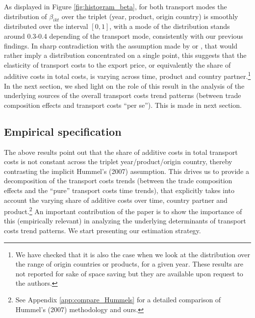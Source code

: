 \documentclass[a4paper,11pt]{article}
\begin{document}
As displayed in Figure \ref{fig:histogram_beta}, for both transport modes the distribution of $\beta_{ikt}$ over the triplet (year, product, origin country) is smoothly distributed over the interval $[0,1]$, with a mode of the distribution stands around 0.3-0.4 depending of the transport mode, consistently with our previous findings. In sharp contradiction with the assumption made by  \cite{hummels_skiba} or \cite{hummels2007}, that would rather imply a distribution concentrated on a single point, this suggests that the elasticity of transport costs to the export price, or equivalently the share of additive costs in total costs, is varying across time, product and country partner.\footnote{We have checked that it is also the case when we look at the distribution over the range of origin countries or products, for a given year. These results are not reported for sake of space saving but they are available upon request to the authors.} In the next section, we shed light on the role of this result in the analysis of the  underlying sources of the overall transport costs trend patterns (between trade composition effects and transport costs ``per se''). This is made in next section.

\subsection{Empirical specification}

The above results point out that the share of additive costs in total transport costs is not constant across the triplet year/product/origin country, thereby contrasting the implicit Hummel's (2007) assumption. This drives us to provide a decomposition of the transport costs trends (between the trade composition effects and the ``pure'' transport costs time trends), that explicitly takes into account the varying share of additive costs over time, country partner and product.\footnote{See Appendix \ref{app:compare_Hummels} for a detailed comparison of Hummel's (2007) methodology and ours.} An important contribution of the paper is to show the importance of this (empirically relevant) in analyzing the underlying determinants of transport costs trend patterns. We start presenting our estimation strategy.\smallskip
\end{document}
